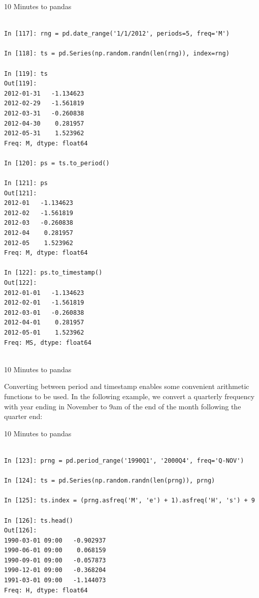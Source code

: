 \documentclass{beamer}
\begin{document}
\begin{frame}[t,fragile]{10 Minutes to pandas}


	\scriptsize
\begin{verbatim}

In [117]: rng = pd.date_range('1/1/2012', periods=5, freq='M')

In [118]: ts = pd.Series(np.random.randn(len(rng)), index=rng)

In [119]: ts
Out[119]: 
2012-01-31   -1.134623
2012-02-29   -1.561819
2012-03-31   -0.260838
2012-04-30    0.281957
2012-05-31    1.523962
Freq: M, dtype: float64

In [120]: ps = ts.to_period()

In [121]: ps
Out[121]: 
2012-01   -1.134623
2012-02   -1.561819
2012-03   -0.260838
2012-04    0.281957
2012-05    1.523962
Freq: M, dtype: float64

In [122]: ps.to_timestamp()
Out[122]: 
2012-01-01   -1.134623
2012-02-01   -1.561819
2012-03-01   -0.260838
2012-04-01    0.281957
2012-05-01    1.523962
Freq: MS, dtype: float64


\end{verbatim}


\end{frame}


\begin{frame}[t]{10 Minutes to pandas}

Converting between period and timestamp enables some convenient arithmetic
functions to be used. In the following example, we convert a quarterly
frequency with year ending in November to 9am of the end of the month following
the quarter end:

\end{frame}


\begin{frame}[t,fragile]{10 Minutes to pandas}


	\scriptsize
\begin{verbatim}

In [123]: prng = pd.period_range('1990Q1', '2000Q4', freq='Q-NOV')

In [124]: ts = pd.Series(np.random.randn(len(prng)), prng)

In [125]: ts.index = (prng.asfreq('M', 'e') + 1).asfreq('H', 's') + 9

In [126]: ts.head()
Out[126]: 
1990-03-01 09:00   -0.902937
1990-06-01 09:00    0.068159
1990-09-01 09:00   -0.057873
1990-12-01 09:00   -0.368204
1991-03-01 09:00   -1.144073
Freq: H, dtype: float64


\end{verbatim}


\end{frame}
\end{document}
